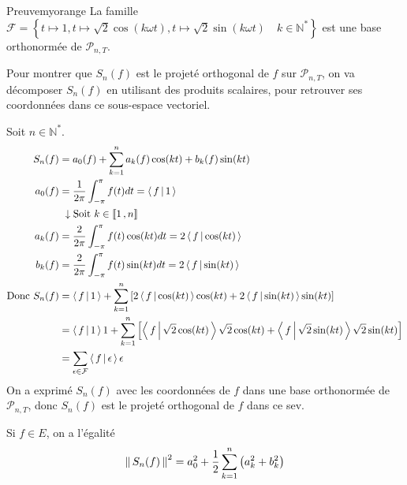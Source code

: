     \begin{demo}{Preuve}{myorange}
        La famille $\mathcal{F} = \left\{ t \mapsto 1, t \mapsto \sqrt{2} \cos(k \omega t), t \mapsto \sqrt{2} \sin (k \omega t) \quad k \in \mathbb{N}^* \right\}$ est une base orthonormée de $\mathcal{P}_{n,T}$.

        Pour montrer que $S_n(f)$ est le projeté orthogonal de $f$ sur $\mathcal{P}_{n,T}$, on va décomposer $S_n(f)$ en utilisant des produits scalaires, pour retrouver ses coordonnées dans ce sous-espace vectoriel.

        Soit $n \in \mathbb{N}^*$.
        \begin{align*}
            S_n(f) &= a_0(f) + \sum\limits_{k=1}^n a_k(f) \cos(kt) + b_k(f) \sin(kt) \\
            a_0(f) &= \frac{1}{2\pi} \int_{-\pi}^{\pi} f(t)dt = \left<\,f\,\middle|\,1\,\right> \\
            & \ \downarrow \text{Soit } k \in \left\llbracket 1 \, , n \right\rrbracket \\
            a_k(f) &= \frac{2}{2\pi} \int_{-\pi}^{\pi} f(t) \cos(kt) dt = 2 \left<\,f\,\middle|\,\cos(kt)\,\right> \\
            b_k(f) &= \frac{2}{2\pi} \int_{-\pi}^{\pi} f(t) \sin(kt) dt = 2 \left<\,f\,\middle|\,\sin(kt)\,\right> \\
            \text{Donc } S_n(f) &= \left<\,f\,\middle|\,1\,\right> + \sum\limits_{k=1}^n \left[2 \left<\,f\,\middle|\,\cos(kt)\,\right>\cos(kt) + 2 \left<\,f\,\middle|\,\sin(kt)\,\right>\sin(kt)\right] \\
            &= \left<\,f\,\middle|\,1\,\right>1 + \sum\limits_{k=1}^n \left[\left<\,f\,\middle|\,\sqrt{2} \cos(kt)\,\right> \sqrt{2}\cos(kt) + \left<\,f\,\middle|\,\sqrt{2}\sin(kt)\,\right>\sqrt{2}\sin(kt)\right] \\
            &= \sum\limits_{\epsilon \in \mathcal{F}} \left<\,f\,\middle|\,\epsilon\,\right>\epsilon
        \end{align*}
        On a exprimé $S_n(f)$ avec les coordonnées de $f$ dans une base orthonormée de $\mathcal{P}_{n,T}$, donc $S_n(f)$ est le projeté orthogonal de $f$ dans ce sev.
    \end{demo}

    \begin{coro}{}{}
        Si $f \in E$, on a l’égalité 
        \[ \left\lVert\,S_n(f)\,\right\rVert^2 = a_0^2 + \frac{1}{2} \sum\limits_{k=1}^n \left(a_k^2 + b_k^2\right) \]
    \end{coro}

